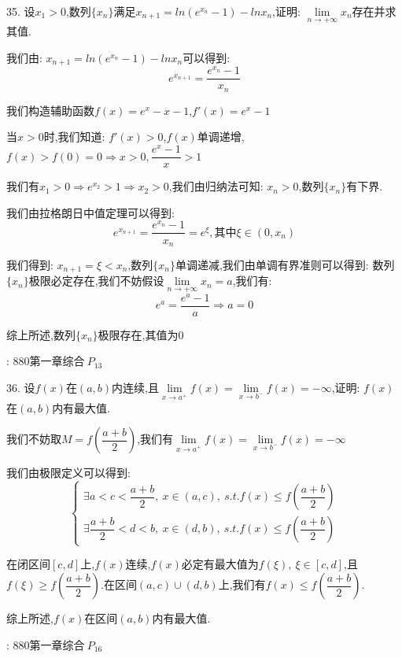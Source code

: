 35. 设$x_{1}>0$,数列$\{x_{n}\}$满足$x_{n+1}=ln(e^{x_{n}}-1)-ln x_{n}$,证明:  $\lim\limits_{n\rightarrow +\infty}x_{n}$存在并求其值.
\begin{solution}
	
	我们由:  $x_{n+1}=ln(e^{x_{n}}-1)-ln x_{n}$可以得到:  
	$$e^{x_{n+1}}=\dfrac{e^{x_{n}}-1}{x_{n}}$$
	
	我们构造辅助函数$f(x)=e^x-x-1$,$f'(x)=e^{x}-1$
	
	当$x>0$时,我们知道:  $f'(x)>0$,$f(x)$单调递增,$f(x)>f(0)=0\Rightarrow  x>0,\dfrac{e^x-1}{x}>1$
	
	我们有$x_{1}>0\Rightarrow e^{x_{2}}>1\Rightarrow x_{2}>0$,我们由归纳法可知:  $x_{n}>0$,数列$\{ x_{n}\}$有下界.
	
	我们由拉格朗日中值定理可以得到:  
	$$e^{x_{n+1}}=\dfrac{e^{x_{n}}-1}{x_{n}}=e^{\xi},\text{其中}\xi\in(0,x_{n})$$
	
	我们得到:  $x_{n+1}=\xi<x_{n}$,数列$\{x_{n}\}$单调递减,我们由单调有界准则可以得到:  数列$\{x_{n}\}$极限必定存在,我们不妨假设$\lim\limits_{n\rightarrow +\infty}x_{n}=a$,我们有:  
	$$e^{a}=\dfrac{e^a-1}{a}\Rightarrow a=0$$
	
	综上所述,数列$\{x_{n}\}$极限存在,其值为$0$
\end{solution}
\begin{anymark}[注]
	[题目来源]:  $880\text{第一章综合} \ P_{13}$
\end{anymark}

36. 设$f(x)$在$(a,b)$内连续,且$\lim\limits_{x\rightarrow a^{+}}f(x)=\lim\limits_{x\rightarrow b^{-}}f(x)=-\infty$,证明:  $f(x)$在$(a,b)$内有最大值.
\begin{solution}
	
	我们不妨取$M=f(\dfrac{a+b}{2})$,我们有$\lim\limits_{x\rightarrow a^{+}}f(x)=\lim\limits_{x\rightarrow b^{-}}f(x)=-\infty$
	
	我们由极限定义可以得到:  
	$$\left\lbrace
	\begin{array}{l}
		\exists a<c<\dfrac{a+b}{2},\ x\in(a,c),\ s.t. f(x)\leq f(\dfrac{a+b}{2})\\
		\exists \dfrac{a+b}{2}<d<b,\ x\in(d,b),\ s.t. f(x)\leq f(\dfrac{a+b}{2})
	\end{array}
	\right. $$
	
	在闭区间$[c,d]$上,$f(x)$连续,$f(x)$必定有最大值为$f(\xi),\ \xi\in[c,d]$,且$f(\xi)\geq f(\dfrac{a+b}{2})$.在区间$(a,c)\cup (d,b)$上,我们有$f(x)\leq f(\dfrac{a+b}{2})$.
	
	综上所述,$f(x)$在区间$(a,b)$内有最大值.
\end{solution}
\begin{anymark}[注]
	[题目来源]:  $880\text{第一章综合} \ P_{16}$
\end{anymark}

